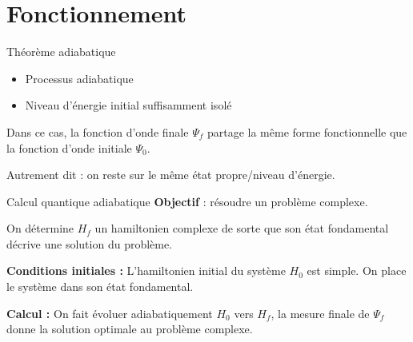 \documentclass{beamer}
\begin{document}
\section{Fonctionnement}
\begin{frame}{Théorème adiabatique}
    \begin{itemize}
        \item Processus adiabatique
        \item Niveau d'énergie initial suffisamment isolé 
    \end{itemize}

    Dans ce cas, la fonction d'onde finale $\Psi_f$ partage la même forme fonctionnelle que la fonction d'onde initiale $\Psi_0$. \medskip

    Autrement dit : on reste sur le même état propre/niveau d'énergie.

\end{frame}


\begin{frame}{Calcul quantique adiabatique}
\textbf{Objectif} : résoudre un problème complexe. 

\medskip

On détermine $H_f$ un hamiltonien complexe de sorte que son état fondamental décrive une solution du problème. 

\medskip

\textbf{Conditions initiales :} L'hamiltonien initial du système $H_0$ est simple. On place le système dans son état fondamental.

\medskip

\textbf{Calcul :} On fait évoluer adiabatiquement $H_0$ vers $H_f$, la mesure finale de $\Psi_f$ donne la solution optimale au problème complexe.

\end{frame}
\end{document}
